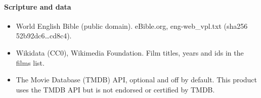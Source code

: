 \documentclass[10pt]{article}
\theoremstyle{remark}
\begin{document}
\paragraph{Scripture and data}
\begin{itemize}[leftmargin=1em,itemsep=0pt,topsep=1pt,parsep=0pt]
\item World English Bible (public domain). eBible.org, eng-web\_vpl.txt (sha256 52b92dc6\ldots{}cd8c4).
\item Wikidata (CC0), Wikimedia Foundation. Film titles, years and ids in the films list.
\item The Movie Database (TMDB) API, optional and off by default. This product uses the TMDB API but is not endorsed or certified by TMDB.
\end{itemize}
\normalsize
\renewcommand{\refname}{Works cited}
\begingroup\small
\end{document}
